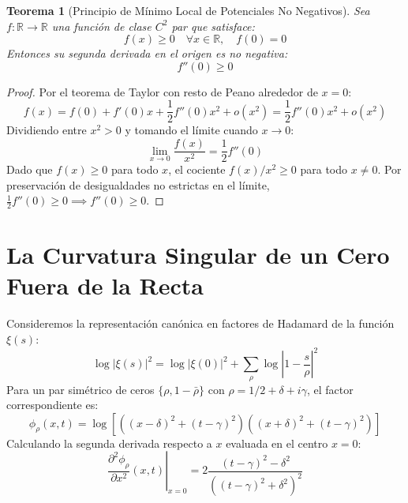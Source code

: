 \documentclass[11pt,a4paper]{article}
\newtheorem{teorema}{Teorema}[section]
\begin{document}
\begin{teorema}[Principio de Mínimo Local de Potenciales No Negativos]
Sea $f: \mathbb{R} \to \mathbb{R}$ una función de clase $C^2$ par que satisface:
\begin{equation}
    f(x) \ge 0 \quad \forall x \in \mathbb{R}, \quad f(0) = 0
\end{equation}
Entonces su segunda derivada en el origen es no negativa:
\begin{equation}
    f''(0) \ge 0
\end{equation}
\end{teorema}
\begin{proof}
Por el teorema de Taylor con resto de Peano alrededor de $x = 0$:
\begin{equation}
    f(x) = f(0) + f'(0) x + \frac{1}{2} f''(0) x^2 + o(x^2) = \frac{1}{2} f''(0) x^2 + o(x^2)
\end{equation}
Dividiendo entre $x^2 > 0$ y tomando el límite cuando $x \to 0$:
\begin{equation}
    \lim_{x \to 0} \frac{f(x)}{x^2} = \frac{1}{2} f''(0)
\end{equation}
Dado que $f(x) \ge 0$ para todo $x$, el cociente $f(x)/x^2 \ge 0$ para todo $x \ne 0$. Por preservación de desigualdades no estrictas en el límite, $\frac{1}{2} f''(0) \ge 0 \implies f''(0) \ge 0$.
\end{proof}

\section{La Curvatura Singular de un Cero Fuera de la Recta}

Consideremos la representación canónica en factores de Hadamard de la función $\xi(s)$:
\begin{equation}
    \log |\xi(s)|^2 = \log |\xi(0)|^2 + \sum_{\rho} \log \left| 1 - \frac{s}{\rho} \right|^2
\end{equation}
Para un par simétrico de ceros $\{\rho, 1 - \bar{\rho}\}$ con $\rho = 1/2 + \delta + i\gamma$, el factor correspondiente es:
\begin{equation}
    \phi_\rho(x, t) = \log \left[ ((x - \delta)^2 + (t - \gamma)^2)((x + \delta)^2 + (t - \gamma)^2) \right]
\end{equation}
Calculando la segunda derivada respecto a $x$ evaluada en el centro $x = 0$:
\begin{equation}
    \left. \frac{\partial^2 \phi_\rho}{\partial x^2}(x, t) \right|_{x=0} = 2 \frac{(t - \gamma)^2 - \delta^2}{\left((t - \gamma)^2 + \delta^2\right)^2}
\end{equation}
\end{document}
